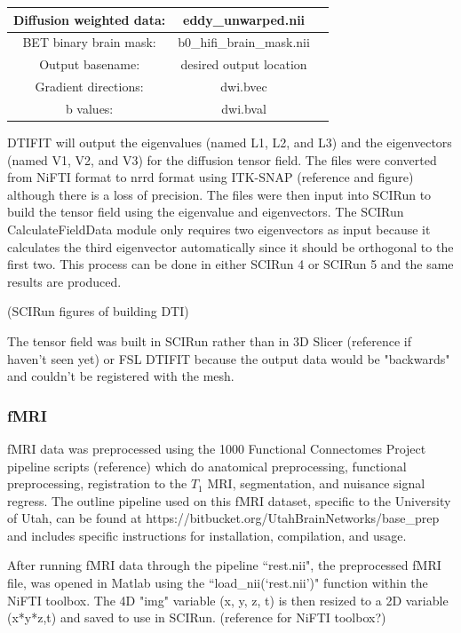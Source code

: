 \begin{center}
\begin{tabular}{ |c|c|c| } 
 \hline
 Diffusion weighted data: & eddy\_unwarped.nii \\ 
 \hline
 BET binary brain mask: & b0\_hifi\_brain\_mask.nii \\ 
 \hline
 Output basename: & desired output location \\ 
 \hline
 Gradient directions: & dwi.bvec\\
 \hline
 b values: & dwi.bval\\
 \hline
\end{tabular}
\end{center}

DTIFIT will output the eigenvalues (named L1, L2, and L3) and the eigenvectors (named V1, V2, and V3) for the diffusion tensor field. The files were converted from NiFTI format to nrrd format using ITK-SNAP (reference and figure) although there is a loss of precision. The files were then input into SCIRun to build the tensor field using the eigenvalue and eigenvectors. The SCIRun CalculateFieldData module only requires two eigenvectors as input because it calculates the third eigenvector automatically since it should be orthogonal to the first two. This process can be done in either SCIRun 4 or SCIRun 5 and the same results are produced. 

(SCIRun figures of building DTI) 

The tensor field was built in SCIRun rather than in 3D Slicer (reference if haven't seen yet) or FSL DTIFIT because the output data would be "backwards" and couldn't be registered with the mesh. 

\subsubsection{fMRI}

fMRI data was preprocessed using the 1000 Functional Connectomes Project pipeline scripts (reference) which do anatomical preprocessing, functional preprocessing, registration to the $T_1$ MRI, segmentation, and nuisance signal regress. The outline pipeline used on this fMRI dataset, specific to the University of Utah, can be found at https://bitbucket.org/UtahBrainNetworks/base\_prep and includes specific instructions for installation, compilation, and usage.  

After running fMRI data through the pipeline ``rest.nii", the preprocessed fMRI file, was opened in Matlab using the ``load\_nii(`rest.nii')" function within the NiFTI toolbox. The 4D "img" variable (x, y, z, t) is then resized to a 2D variable (x*y*z,t) and saved to use in SCIRun. (reference for NiFTI toolbox?)

